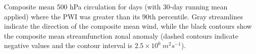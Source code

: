 \label{fig:pwi_spatial_summary}
Composite mean 500 hPa circulation for days (with 30-day running mean applied) where the PWI was greater than its 90th percentile. Gray streamlines indicate the direction of the composite mean wind, while the black contours show the composite mean streamfunction zonal anomaly (dashed contours indicate negative values and the contour interval is $2.5 \times 10^6 \: m^2 s^{-1}$). 